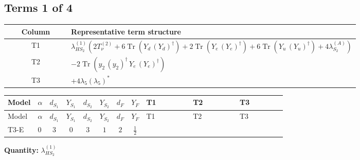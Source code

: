 \documentclass[8pt]{article}
\begin{document}
\begin{landscape}
\subsection*{Terms 1 of 4}
\begin{center}
\begin{tabular}{@{}c >{\raggedright\arraybackslash}p{0.82\linewidth}@{}}
\toprule
Column & Representative term structure \\
\midrule
T1 & \(\displaystyle {\lambda_{HS_2}^{(1)}} (2 T_{\nu}^{(2)}+6 \operatorname{Tr}\!\left({Y_d}\,\left({Y_d}\right)^{\dagger}\right)+2 \operatorname{Tr}\!\left({Y_e}\,\left({Y_e}\right)^{\dagger}\right)+6 \operatorname{Tr}\!\left({Y_u}\,\left({Y_u}\right)^{\dagger}\right)+4 {\lambda_{S_2}^{(A)}})\) \\
\midrule
T2 & \(\displaystyle -2 \operatorname{Tr}\!\left({y_2}\,\left({y_2}\right)^{\dagger}\,{Y_e}\,\left({Y_e}\right)^{\dagger}\right)\) \\
\midrule
T3 & \(\displaystyle +4 {\lambda_5} \left({\lambda_5}\right)^{*}\) \\
\midrule
\bottomrule
\end{tabular}
\end{center}
\smallskip
\tiny
\begin{longtable}{@{}llcccccc >{\raggedright\arraybackslash}p{0.21\linewidth} >{\raggedright\arraybackslash}p{0.21\linewidth} >{\raggedright\arraybackslash}p{0.21\linewidth}@{}}
\toprule
Model & $\alpha$ & $d_{S_1}$ & $Y_{S_1}$ & $d_{S_2}$ & $Y_{S_2}$ & $d_F$ & $Y_F$ & T1 & T2 & T3 \\
\midrule
\endfirsthead
\toprule
Model & $\alpha$ & $d_{S_1}$ & $Y_{S_1}$ & $d_{S_2}$ & $Y_{S_2}$ & $d_F$ & $Y_F$ & T1 & T2 & T3 \\
\midrule
\endhead
T3-E & $0$ & $3$ & $0$ & $3$ & $1$ & $2$ & $\frac{1}{2}$ & \scriptsize\adjustbox{max width=\linewidth}{$\begin{gathered} {\lambda_{HS_2}^{(1)}} (2 T_{\nu}^{(2)}+6 \operatorname{Tr}\!\left({Y_d}\,\left({Y_d}\right)^{\dagger}\right)+2 \operatorname{Tr}\!\left({Y_e}\,\left({Y_e}\right)^{\dagger}\right)+6 \operatorname{Tr}\!\left({Y_u}\,\left({Y_u}\right)^{\dagger}\right)+4 {\lambda_{S_2}^{(A)}})\end{gathered}$} & \scriptsize\adjustbox{max width=\linewidth}{$\begin{gathered} -2 \operatorname{Tr}\!\left({y_2}\,\left({y_2}\right)^{\dagger}\,{Y_e}\,\left({Y_e}\right)^{\dagger}\right)\end{gathered}$} & \scriptsize\adjustbox{max width=\linewidth}{$\begin{gathered} +4 {\lambda_5} \left({\lambda_5}\right)^{*}\end{gathered}$} \\
\midrule
\bottomrule
\end{longtable}
\clearpage
\noindent\textbf{Quantity: }$\lambda_{HS_2}^{(1)}$\par\smallskip

\end{landscape}
\end{document}
